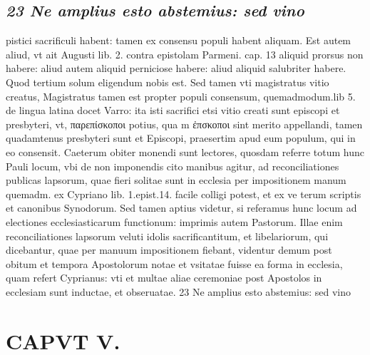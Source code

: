 \documentclass{article}
\begin{document}
\begin{pages}
\subsection*{\textit{23 Ne amplius esto abstemius: sed vino}}pistici sacrificuli habent: tamen ex consensu populi habent aliquam. Est autem aliud, vt ait Augusti lib. 2. contra epistolam Parmeni. cap. 13 aliquid prorsus non habere: aliud autem aliquid perniciose habere: aliud aliquid salubriter habere. Quod tertium solum eligendum nobis est. Sed tamen vti magistratus vitio creatus, Magistratus tamen est propter populi consensum, quemadmodum.lib 5. de lingua latina docet Varro: ita isti sacrifici etsi vitio creati sunt episcopi et presbyteri, vt, παρεπίσκοποι potius, qua m ἐπσκοποι sint merito appellandi, tamen quadamtenus presbyteri sunt et Episcopi, praesertim apud eum populum, qui in eo consensit. Caeterum obiter monendi sunt lectores, quosdam referre totum hunc Pauli locum, vbi de non imponendis cito manibus agitur, ad reconciliationes publicas lapsorum, quae fieri solitae sunt in ecclesia per impositionem manum quemadm. ex Cypriano lib. 1.epist.14. facile colligi potest, et ex ve terum scriptis et canonibus Synodorum. Sed tamen aptius videtur, si referamus hunc locum ad electiones ecclesiasticarum functionum: imprimis autem Pastorum. Illae enim reconciliationes lapsorum veluti idolis sacrificantitum, et libelariorum, qui dicebantur, quae per manuum impositionem fiebant, videntur demum post obitum et tempora Apostolorum notae et vsitatae fuisse ea forma in ecclesia, quam refert Cyprianus: vti et multae aliae ceremoniae post Apostolos in ecclesiam sunt inductae, et obseruatae. 23 Ne amplius esto abstemius: sed vino  \pend
\section*{CAPVT  V. }
\marginpar{[ p.123 ]}\pstart {}
{}

\end{pages}
\end{document}
